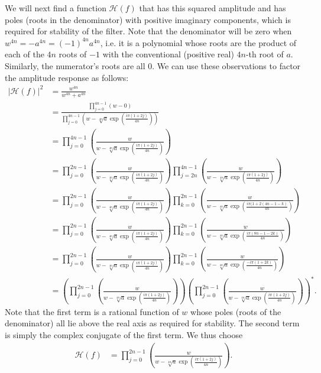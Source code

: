 \documentclass[a4paper]{article}
\begin{document}
We will next find a function $\mathcal{H}(f)$ that has this squared amplitude
and has poles (roots in the denominator) with positive imaginary components,
which is required for stability of the filter.
Note that the denominator will be zero when $w^{4n} = -a^{4n} = (-1)^{4n}
a^{4n}$, i.e. it is a polynomial whose roots are the product of each of the
$4n$ roots of $-1$ with the conventional (positive real) $4n$-th root of $a$.
Similarly, the numerator's roots are all $0$.  We can use these observations to
factor the amplitude response as follows:
\begin{align}
    |\mathcal{H}(f)|^2 &= \frac{w^{4n}}{w^{4n} + a^{4n}} \\
                       &=  \frac{\prod_{j=0}^{4 n - 1}(w - 0)}{\prod_{j=0}^{4 n - 1}\left(w - \sqrt[4n]{a}\exp\left(\frac{i \pi (1 + 2 j)}{4 n}\right)\right)} \\
                       &= \prod_{j=0}^{4 n - 1} \left(\frac{w}{w - \sqrt[4n]{a}\exp\left(\frac{i \pi (1 + 2 j)}{4 n}\right)}\right) \\
                       &= \prod_{j=0}^{2 n - 1} \left(\frac{w}{w - \sqrt[4n]{a}\exp\left(\frac{i \pi (1 + 2 j)}{4 n}\right)}\right)
                          \prod_{j=2n}^{4 n - 1} \left(\frac{w}{w - \sqrt[4n]{a}\exp\left(\frac{i \pi (1 + 2 j)}{4 n}\right)}\right) \\
                       &= \prod_{j=0}^{2 n - 1} \left(\frac{w}{w - \sqrt[4n]{a}\exp\left(\frac{i \pi (1 + 2 j)}{4 n}\right)}\right)
                          \prod_{k=0}^{2 n - 1} \left(\frac{w}{w - \sqrt[4n]{a}\exp\left(\frac{i \pi (1 + 2 (4 n - 1 - k)}{4 n}\right)}\right) \\
                       &= \prod_{j=0}^{2 n - 1} \left(\frac{w}{w - \sqrt[4n]{a}\exp\left(\frac{i \pi (1 + 2 j)}{4 n}\right)}\right)
                          \prod_{k=0}^{2 n - 1} \left(\frac{w}{w - \sqrt[4n]{a}\exp\left(\frac{i \pi (8n - 1 - 2 k)}{4 n}\right)}\right) \\
                       &= \prod_{j=0}^{2 n - 1} \left(\frac{w}{w - \sqrt[4n]{a}\exp\left(\frac{i \pi (1 + 2 j)}{4 n}\right)}\right)
                          \prod_{k=0}^{2 n - 1} \left(\frac{w}{w - \sqrt[4n]{a}\exp\left(\frac{-i \pi (1 + 2 k)}{4 n}\right)}\right) \\
                       &= \left(\prod_{j=0}^{2 n - 1} \left(\frac{w}{w - \sqrt[4n]{a}\exp\left(\frac{i \pi (1 + 2 j)}{4 n}\right)}\right)\right)
                          \left(\prod_{j=0}^{2 n - 1} \left(\frac{w}{w - \sqrt[4n]{a}\exp\left(\frac{i \pi (1 + 2 j)}{4 n}\right)}\right)\right)^{*}.
\end{align}
Note that the first term is a rational function of $w$ whose poles (roots of
the denominator) all lie above the real axis as required for stability.  The
second term is simply the complex conjugate of the first term.  We thus choose
\begin{align}
    \mathcal{H}(f) &= \prod_{j=0}^{2 n - 1} \left(\frac{w}{w - \sqrt[4n]{a}\exp\left(\frac{i \pi (1 + 2 j)}{4 n}\right)}\right).
\end{align}
\end{document}
